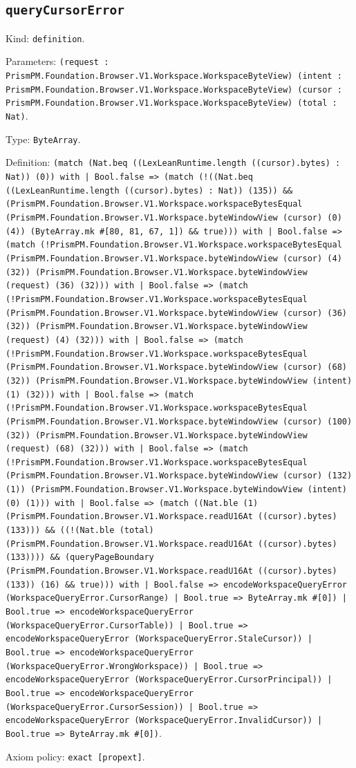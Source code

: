\documentclass[11pt]{article}
\begin{document}
\subsection*{\texttt{queryCursorError}}
\noindent Kind: \texttt{definition}.\par
\noindent Parameters: \texttt{(request : PrismPM.Foundation.Browser.V1.Workspace.WorkspaceByteView) (intent : PrismPM.Foundation.Browser.V1.Workspace.WorkspaceByteView) (cursor : PrismPM.Foundation.Browser.V1.Workspace.WorkspaceByteView) (total : Nat)}.\par
\noindent Type: \texttt{ByteArray}.\par
\noindent Definition: \texttt{(match (Nat.beq ((LexLeanRuntime.length ((cursor).bytes) : Nat)) (0)) with | Bool.false => (match (!((Nat.beq ((LexLeanRuntime.length ((cursor).bytes) : Nat)) (135)) \&\& (PrismPM.Foundation.Browser.V1.Workspace.workspaceBytesEqual (PrismPM.Foundation.Browser.V1.Workspace.byteWindowView (cursor) (0) (4)) (ByteArray.mk \#[80, 81, 67, 1]) \&\& true))) with | Bool.false => (match (!PrismPM.Foundation.Browser.V1.Workspace.workspaceBytesEqual (PrismPM.Foundation.Browser.V1.Workspace.byteWindowView (cursor) (4) (32)) (PrismPM.Foundation.Browser.V1.Workspace.byteWindowView (request) (36) (32))) with | Bool.false => (match (!PrismPM.Foundation.Browser.V1.Workspace.workspaceBytesEqual (PrismPM.Foundation.Browser.V1.Workspace.byteWindowView (cursor) (36) (32)) (PrismPM.Foundation.Browser.V1.Workspace.byteWindowView (request) (4) (32))) with | Bool.false => (match (!PrismPM.Foundation.Browser.V1.Workspace.workspaceBytesEqual (PrismPM.Foundation.Browser.V1.Workspace.byteWindowView (cursor) (68) (32)) (PrismPM.Foundation.Browser.V1.Workspace.byteWindowView (intent) (1) (32))) with | Bool.false => (match (!PrismPM.Foundation.Browser.V1.Workspace.workspaceBytesEqual (PrismPM.Foundation.Browser.V1.Workspace.byteWindowView (cursor) (100) (32)) (PrismPM.Foundation.Browser.V1.Workspace.byteWindowView (request) (68) (32))) with | Bool.false => (match (!PrismPM.Foundation.Browser.V1.Workspace.workspaceBytesEqual (PrismPM.Foundation.Browser.V1.Workspace.byteWindowView (cursor) (132) (1)) (PrismPM.Foundation.Browser.V1.Workspace.byteWindowView (intent) (0) (1))) with | Bool.false => (match ((Nat.ble (1) (PrismPM.Foundation.Browser.V1.Workspace.readU16At ((cursor).bytes) (133))) \&\& ((!(Nat.ble (total) (PrismPM.Foundation.Browser.V1.Workspace.readU16At ((cursor).bytes) (133)))) \&\& (queryPageBoundary (PrismPM.Foundation.Browser.V1.Workspace.readU16At ((cursor).bytes) (133)) (16) \&\& true))) with | Bool.false => encodeWorkspaceQueryError (WorkspaceQueryError.CursorRange) | Bool.true => ByteArray.mk \#[0]) | Bool.true => encodeWorkspaceQueryError (WorkspaceQueryError.CursorTable)) | Bool.true => encodeWorkspaceQueryError (WorkspaceQueryError.StaleCursor)) | Bool.true => encodeWorkspaceQueryError (WorkspaceQueryError.WrongWorkspace)) | Bool.true => encodeWorkspaceQueryError (WorkspaceQueryError.CursorPrincipal)) | Bool.true => encodeWorkspaceQueryError (WorkspaceQueryError.CursorSession)) | Bool.true => encodeWorkspaceQueryError (WorkspaceQueryError.InvalidCursor)) | Bool.true => ByteArray.mk \#[0])}.\par
\noindent Axiom policy: \texttt{exact [propext]}.\par
\end{document}
